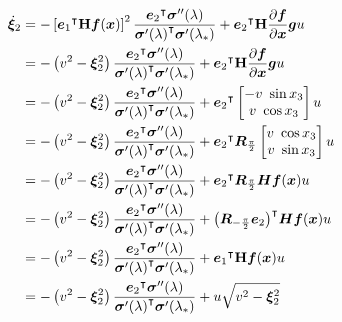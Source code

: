 \documentclass[oneside, 11pt]{book}
\begin{document}
\begin{align*}
    \dot{\bm{\xi}}_2 &=
                    -\left[{\bm{e}_1}^{\intercal}\mathbf{H}\bm{f}(\bm{x})\right]^2  \frac{{\bm{e}_2}^{\intercal}\bm{\sigma}''(\lambda)}{{\bm{\sigma}'(\lambda)}^{\intercal}\bm{\sigma}'(\lambda_*)}
                    +
                    {\bm{e}_2}^{\intercal}\mathbf{H}\frac{\partial\bm{f}}{\partial\bm{x}}\bm{g} u\\
                &=
                    -\left(v^2 - \bm{\xi}_2^2\right) \frac{{\bm{e}_2}^{\intercal}\bm{\sigma}''(\lambda)}{{\bm{\sigma}'(\lambda)}^{\intercal}\bm{\sigma}'(\lambda_*)}
                    +
                    {\bm{e}_2}^{\intercal}\mathbf{H}\frac{\partial\bm{f}}{\partial\bm{x}}\bm{g} u\\
                &=
                    -\left(v^2 - \bm{\xi}_2^2\right) \frac{{\bm{e}_2}^{\intercal}\bm{\sigma}''(\lambda)}{{\bm{\sigma}'(\lambda)}^{\intercal}\bm{\sigma}'(\lambda_*)}
                    +
                    {\bm{e}_2}^{\intercal}
                        \begin{bmatrix}
                            -v~\sin x_3 \\
                            v~\cos x_3
                        \end{bmatrix}
                    u\\
                &=
                    -\left(v^2 - \bm{\xi}_2^2\right) \frac{{\bm{e}_2}^{\intercal}\bm{\sigma}''(\lambda)}{{\bm{\sigma}'(\lambda)}^{\intercal}\bm{\sigma}'(\lambda_*)}
                    +
                    {\bm{e}_2}^{\intercal}\bm{R}_{\frac{\pi}{2}}
                        \begin{bmatrix}
                            v~\cos x_3 \\
                            v~\sin x_3
                        \end{bmatrix}
                    u\\
                &=
                    -\left(v^2 - \bm{\xi}_2^2\right) \frac{{\bm{e}_2}^{\intercal}\bm{\sigma}''(\lambda)}{{\bm{\sigma}'(\lambda)}^{\intercal}\bm{\sigma}'(\lambda_*)}
                    +
                    {\bm{e}_2}^{\intercal}\bm{R}_{\frac{\pi}{2}}\bm{H}\bm{f}(\bm{x}) u\\
                &=
                    -\left(v^2 - \bm{\xi}_2^2\right) \frac{{\bm{e}_2}^{\intercal}\bm{\sigma}''(\lambda)}{{\bm{\sigma}'(\lambda)}^{\intercal}\bm{\sigma}'(\lambda_*)}
                    +
                    {\left(\bm{R}_{-\frac{\pi}{2}}\bm{e}_2\right)}^{\intercal}\bm{H}\bm{f}(\bm{x}) u\\
                &=
                    -\left(v^2 - \bm{\xi}_2^2\right) \frac{{\bm{e}_2}^{\intercal}\bm{\sigma}''(\lambda)}{{\bm{\sigma}'(\lambda)}^{\intercal}\bm{\sigma}'(\lambda_*)}
                    +
                    {\bm{e}_1}^{\intercal}\mathbf{H}\bm{f}(\bm{x}) u\\
                &=
                    -\left(v^2 - \bm{\xi}_2^2\right) \frac{{\bm{e}_2}^{\intercal}\bm{\sigma}''(\lambda)}{{\bm{\sigma}'(\lambda)}^{\intercal}\bm{\sigma}'(\lambda_*)}
                    +
                    u \sqrt{v^2 - \bm{\xi}_2^2}\\
\end{align*}
\end{document}
